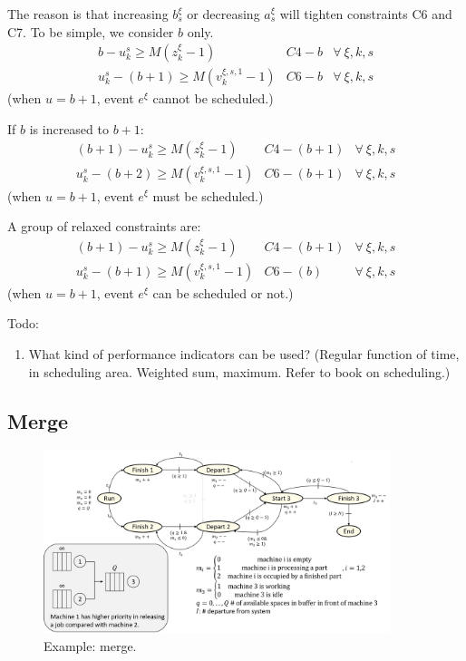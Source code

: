 \documentclass[]{interact}
\theoremstyle{plain}%
\theoremstyle{definition}
\theoremstyle{remark}
\begin{document}
The reason is that increasing $b^{\xi}_s$ or decreasing $a^{\xi}_s$ will tighten constraints C6 and C7. To be simple, we consider $b$ only. 
\begin{eqnarray}
b - u^s_k \ge M(z^{\xi}_{k}-1)&C4-b& \forall\ \xi, k,s\\
u^s_k -  (b+1) \ge M(v^{\xi,s,1}_k-1) &C6-b& \forall\ \xi,k,s
\end{eqnarray}
(when $u=b+1$, event $e^{\xi}$ cannot be scheduled.)

If $b$ is increased to $b+1$:
\begin{eqnarray}
(b+1) - u^s_k \ge M(z^{\xi}_{k}-1)&C4-(b+1)& \forall\ \xi, k,s\\
u^s_k -  (b+2) \ge M(v^{\xi,s,1}_k-1) &C6-(b+1)& \forall\ \xi,k,s
\end{eqnarray}
(when $u=b+1$, event $e^{\xi}$ must be scheduled.)

A group of relaxed constraints are:
\begin{eqnarray}
(b+1) - u^s_k \ge M(z^{\xi}_{k}-1)&C4-(b+1)& \forall\ \xi, k,s\\
u^s_k -  (b+1) \ge M(v^{\xi,s,1}_k-1) &C6-(b)& \forall\ \xi,k,s
\end{eqnarray}
(when $u=b+1$, event $e^{\xi}$ can be scheduled or not.)


Todo: 
\begin{enumerate}
	\item What kind of performance indicators can be used? (Regular function of time, in scheduling area. Weighted sum, maximum. Refer to book on scheduling.)
\end{enumerate}

\newpage

\subsection{Merge}
\begin{figure}[h]
	\centering
	\includegraphics[width=0.9\textwidth]{Figures/merge.png}
	\caption{Example: merge.}
\end{figure}
\end{document}
